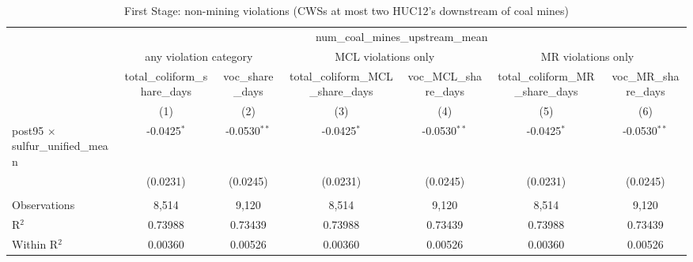 
\begin{table}[htbp]
   \caption{\label{tab:fs_dwnstrm2step_nonminevio} First Stage: non-mining violations (CWSs at most two HUC12's downstream of coal mines)}
   \bigskip
   \centering
   \begin{adjustbox}{width = \textwidth, center}
      \begin{tabular}{lcccccc}
         \toprule
          & \multicolumn{6}{c}{num\_coal\_mines\_upstream\_mean}\\
          & \multicolumn{2}{c}{any violation category} & \multicolumn{2}{c}{MCL violations only} & \multicolumn{2}{c}{MR violations only} \\ 
                                                  & total\_coliform\_share\_days    & voc\_share\_days   & total\_coliform\_MCL\_share\_days     & voc\_MCL\_share\_days    & total\_coliform\_MR\_share\_days     & voc\_MR\_share\_days \\      
                                                  & (1)                             & (2)                & (3)                                   & (4)                      & (5)                                  & (6)\\  
         \midrule 
         post95 $\times$ sulfur\_unified\_mean    & -0.0425$^{*}$                   & -0.0530$^{**}$     & -0.0425$^{*}$                         & -0.0530$^{**}$           & -0.0425$^{*}$                        & -0.0530$^{**}$\\   
                                                  & (0.0231)                        & (0.0245)           & (0.0231)                              & (0.0245)                 & (0.0231)                             & (0.0245)\\   
          \\
         Observations                             & 8,514                           & 9,120              & 8,514                                 & 9,120                    & 8,514                                & 9,120\\  
         R$^2$                                    & 0.73988                         & 0.73439            & 0.73988                               & 0.73439                  & 0.73988                              & 0.73439\\  
         Within R$^2$                             & 0.00360                         & 0.00526            & 0.00360                               & 0.00526                  & 0.00360                              & 0.00526\\  

\end{tabular}
\end{adjustbox}
\end{table}
